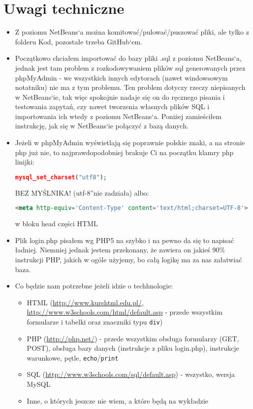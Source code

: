 \documentclass[a4paper, 11pt]{article}
\begin{document}
	\section{Uwagi techniczne}
	\begin{itemize}
		\item Z poziomu NetBeans`a można komitować/pulować/puszować pliki, ale tylko z folderu Kod, pozostałe trzeba GitHub`em.
		\item Początkowo chciałem importować do bazy pliki .sql z poziomu NetBeans`a, jednak jest tam problem z rozkodowywaniem plików sql generowanych przez phpMyAdmin - we wszystkich innych edytorach (nawet windowsowym notatniku) nie ma z tym problemu. Ten problem dotyczy rzeczy niepisanych w NetBeans`ie, tak więc spokojnie nadaje się on do ręcznego pisania i testowania zapytań, czy nawet tworzenia własnych plików SQL i importowania ich wtedy z poziomu NetBeans`a. Poniżej zamieściłem instrukcję, jak się w NetBeans`ie połączyć z bazą danych.
		\item Jeżeli w phpMyAdmin wyświetlają się poprawnie polskie znaki, a na stronie php już nie, to najprawdopodobniej brakuje Ci na początku klamry php linijki:\\
\begin{lstlisting}[language=PHP]		
mysql_set_charset("utf8");
\end{lstlisting}
		BEZ MYŚLNIKA! (\quotedblbase utf-8\textquotedblright nie zadziała)
		albo:
\lstset{
	breaklines=true
}
\begin{lstlisting}[language=HTML]
<meta http-equiv='Content-Type' content='text/html;charset=UTF-8'>
\end{lstlisting}		
		w bloku head części HTML
		\item Plik login.php pisałem wg PHP5 na szybko i na pewno da się to napisać ładniej. Niemniej jednak jestem przekonany, że zawiera on jakieś 90\% instrukcji PHP, jakich w ogóle użyjemy, bo całą logikę ma za nas załatwiać baza.
		\item Co będzie nam potrzebne jeżeli idzie o techhnologie:
		\begin{itemize}
			\item HTML (\url{http://www.kurshtml.edu.pl/}, \url{http://www.w3schools.com/html/default.asp} - przede wszystkim formularze i tabelki oraz znaczniki typu \texttt{div})
			\item PHP (\url{http://php.net/}) - przede wszystkim obsługa formularzy (GET, POST), obsługa bazy danych (instrukcje z pliku login.php), instrukcje warunkowe, pętle, \texttt{echo}/\texttt{print}
			\item SQL (\url{http://www.w3schools.com/sql/default.asp}) - wszystko, wersja MySQL
			\item Inne, o których jeszcze nie wiem, a które będą na wykładzie
		\end{itemize}
	\end{itemize}
\end{document}

